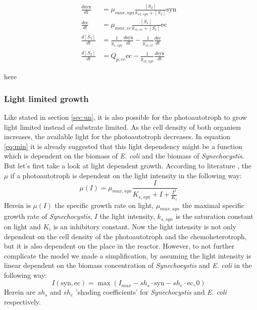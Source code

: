 \documentclass[12pt]{report}
\begin{document}
\begin{align} \label{eq:sd2}
 \frac{d\text{syn}}{dt} &= \mu_{max,syn} \frac{[S_2]}{k_{s2,syn}+[S_2]} \text{syn} \\
 \frac{d\text{ec}}{dt} &= \mu_{max,ec} \frac{[S_1]}{k_{s1,ec}+[S_1]} \text{ec} \\
 \frac{d[S_1]}{dt} &= \frac{1}{y_{s,syn}} \frac{d\text{syn}}{dt} - \frac{1}{y_{s1,ec}} \frac{d\text{ec}}{dt} \\
 \frac{d[S_2]}{dt} &=  Q_{p,ec} \text{ec} - \frac{1}{y_{s2,syn}} \frac{d\text{syn}}{dt}
\end{align}

here
\subsubsection{Light limited growth}
Like stated in section \ref{sec:un}, it is also possible for the photoautotroph to grow light limited instead of substrate limited. As the cell density of both organism increases, the available light for the photoautotroph decreases. In equation \ref{eq:min} it is already suggested that this light dependency might be a function which is dependent on the biomass of \textit{E. coli} and the biomass of \textit{Synechocystis}. But let's first take a look at light dependent growth.
According to literature \cite{franco2006model}, the $\mu$ if a photoautotroph is dependent on the light intensity in the following way:
\begin{equation}
 \mu(I) = \mu_{max,syn}\frac{I}{K_{s,syn}+I+\frac{I^{2}}{K_{i}}}
\end{equation}
Herein is $\mu(I)$ the specific growth rate on light, $\mu_{max,syn}$ the maximal specific growth rate of \textit{Synechocystis}, $I$ the light intensity, $k_{s,syn}$ is the saturation constant on light and $K_{i}$ is an inhibitory constant.
Now the light intensity is not only dependent on the cell density of the photoautotroph and the chemoheterotroph, but it is also dependent on the place in the reactor. However, to not further complicate the model we made a simplification, by assuming the light intensity is linear dependent on the biomass concentration of \textit{Synechocystis} and \textit{E. coli} in the following way:
\begin{equation} \label{eq:I}
 I(\text{syn}, \text{ec}) = \max(I_{max}-sh_{s}\cdot\text{syn}-sh_{e}\cdot\text{ec},0)
\end{equation}
Herein are $sh_{s}$ and $sh_{e}$ 'shading coefficients' for \textit{Synechocystis} and \textit{E. coli} respectively.
\end{document}
